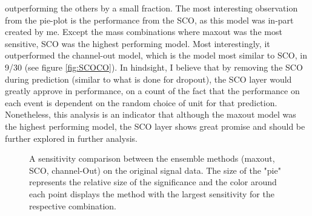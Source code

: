 outperforming the others by a small fraction. The most interesting observation from the pie-plot is the performance from the \ac{SCO}, as 
this model was in-part created by me. Except the mass combinations where maxout was the most sensitive, \ac{SCO} was the highest performing model. 
Most interestingly, it outperformed the channel-out model, which is the model most similar to \ac{SCO}, in 9/30 (see figure \ref{fig:SCOCO}). 
In hindsight, I believe that by removing the \ac{SCO} during prediction (similar to what is done for dropout), the \ac{SCO} layer would greatly 
approve in performance, on a count of the fact that the performance on each event is dependent on the random choice of unit for that prediction.
Nonetheless, this analysis is an indicator that although the maxout model was the highest performing model, the \ac{SCO} layer shows 
great promise and should be further explored in further analysis. 
\begin{figure}
    \caption{A sensitivity comparison between the ensemble methods (maxout, \ac{SCO}, channel-Out) on the original 
    signal data. The size of the "pie" represents the relative size of the significance and the color around each 
    point displays the method with the largest sensitivity for the respective combination.}
    \label{fig:EnsembleComp}
\end{figure}

